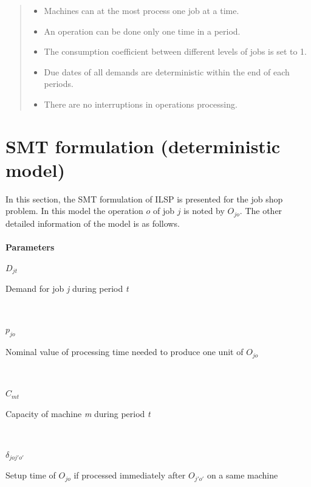 \documentclass[letterpaper]{article} %
\begin{document}
\begin{quote}
\begin{itemize}
\item Machines can at the most process one job at a time.
\item An operation can be done only one time in a period.
\item The consumption coefficient between different levels of jobs is set to 1.
\item Due dates of all demands are deterministic within the end of each periods.
\item There are no interruptions in operations processing.
\end{itemize}
\end{quote}

\section{SMT formulation (deterministic model)}
In this section, the SMT formulation of ILSP is presented for the job shop problem. In this model the operation $o$ of job $j$ is noted by \textit{$O_{jo}$}. The other detailed information of the model is as follows.\\\\

\textbf{Parameters}\\
\parbox{30pt}{\textit{$D_{jt}$}} 
\parbox[t]{207pt}{Demand for job \textit{j} during period \textit{t}}\\
\parbox{30pt}{\textit{$p_{jo}$}} 
\parbox[t]{207pt}{Nominal value of processing time needed to produce one unit of $O_{jo}$}\\
\parbox{30pt}{\textit{$C_{mt}$}} 
\parbox[t]{207pt}{Capacity of machine \textit{m} during period \textit{t}}\\
\parbox{30pt}{\textit{$\delta_{joj'o'}$}} 
\parbox[t]{207pt}{Setup time of $O_{jo}$ if processed immediately after $O_{j'o'}$ on a same machine}\\
\end{document}
